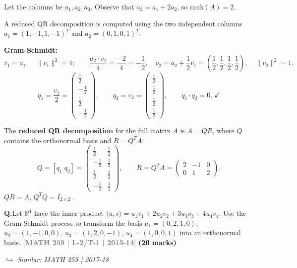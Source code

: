 \documentclass[12pt,a3paper]{article}
\newcommand{\yr}[1]{\hfill\textcolor{gray}{\small\textbf{[#1]}}}
\newcommand{\mk}[1]{\textcolor{orange!70!black}{\small\textbf{(#1 marks)}}}
\newcommand{\variant}[1]{\par\vspace{1pt}\textcolor{blue!50!black}%
  {\footnotesize\textit{$\hookrightarrow$ Similar: #1}}}
\newcounter{qnum}
\newcommand{\Q}[1]{%
  \needspace{4\baselineskip}
  \refstepcounter{qnum}
  \vspace{6pt}
  \noindent\textbf{Q\theqnum.}\enspace #1\par
}
\begin{document}
\begin{tcolorbox}[enhanced,breakable,colback=cD!4,colframe=cD,boxrule=0.8pt,arc=5pt,title={\textbf{Answer --- QR Decomposition of $A=\begin{pmatrix}1&0&1\\-1&1&1\\1&0&1\\-1&1&1\end{pmatrix}$}},fonttitle=\bfseries\color{white},colbacktitle=cD]
Let the columns be $a_1, a_2, a_3$. Observe that $a_3 = a_1 + 2a_2$, so $\mathrm{rank}(A)=2$.

A reduced QR decomposition is computed using the two independent columns $a_1=(1,-1,1,-1)^T$ and $a_2=(0,1,0,1)^T$:

\textbf{Gram-Schmidt:}
$$v_1=a_1,\quad \|v_1\|^2=4;\qquad
\frac{a_2\cdot v_1}{4}=\frac{-2}{4}=-\frac{1}{2},\quad
v_2=a_2+\frac{1}{2}v_1=\left(\frac{1}{2},\frac{1}{2},\frac{1}{2},\frac{1}{2}\right),\quad\|v_2\|^2=1.$$
$$q_1=\frac{v_1}{2}=\begin{pmatrix}\frac{1}{2}\\-\frac{1}{2}\\\frac{1}{2}\\-\frac{1}{2}\end{pmatrix},\qquad
q_2=v_2=\begin{pmatrix}\frac{1}{2}\\\frac{1}{2}\\\frac{1}{2}\\\frac{1}{2}\end{pmatrix},\qquad
q_1\cdot q_2=0.\;\checkmark$$

The \textbf{reduced QR decomposition} for the full matrix $A$ is $A=QR$, where $Q$ contains the orthonormal basis and $R=Q^TA$:
$$Q=[q_1\;q_2]=\begin{pmatrix}\frac{1}{2}&\frac{1}{2}\\-\frac{1}{2}&\frac{1}{2}\\\frac{1}{2}&\frac{1}{2}\\-\frac{1}{2}&\frac{1}{2}\end{pmatrix},\qquad
R=Q^TA=\begin{pmatrix}2&-1&0\\0&1&2\end{pmatrix}.$$
$QR=A$, $Q^TQ=I_{2\times 2}$ . \checkmark
\end{tcolorbox}

\Q{Let $\mathbb{R}^4$ have the inner product $\langle u,v \rangle = u_1v_1 + 2u_2v_2 + 3u_3v_3 + 4u_4v_4$. Use the Gram-Schmidt process to transform the basis $u_1 = (0,2,1,0)$, $u_2 = (1,-1,0,0)$, $u_3 = (1,2,0,-1)$, $u_4 = (1,0,0,1)$ into an orthonormal basis.
\yr{MATH 259 | L-2/T-1 | 2013-14} \mk{20}
\variant{MATH 259 | 2017-18}}
\end{document}

